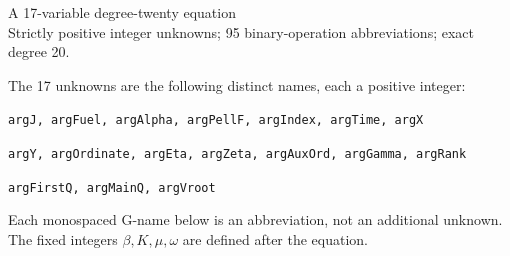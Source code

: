 \documentclass[10pt]{article}
\begin{document}
\begin{center}{\Large A 17-variable degree-twenty equation}\\
Strictly positive integer unknowns; 95 binary-operation abbreviations; exact degree 20.
\end{center}
The 17 unknowns are the following distinct names, each a positive integer:
\par\small
\noindent\texttt{argJ, argFuel, argAlpha, argPellF, argIndex, argTime, argX}\par
\noindent\texttt{argY, argOrdinate, argEta, argZeta, argAuxOrd, argGamma, argRank}\par
\noindent\texttt{argFirstQ, argMainQ, argVroot}\par
\normalsize
Each monospaced G-name below is an abbreviation, not an additional unknown.
The fixed integers $\beta,K,\mu,\omega$ are defined after the equation.
\end{document}
